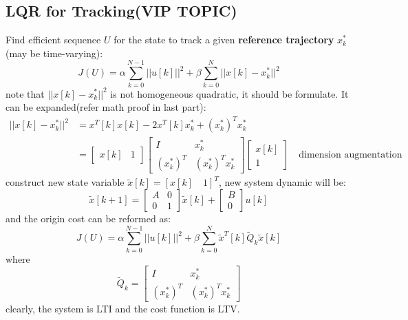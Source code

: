 \documentclass[10pt,a4paper,oneside]{article}
\begin{document}
\subsection{LQR for Tracking(VIP TOPIC)}
Find efficient sequence $U$ for the state to track a given\textbf{ reference trajectory} $x_k^*$(may be time-varying):
\[
J(U) = \alpha \sum_{k=0}^{N-1} ||u[k]||^2 + \beta \sum_{k=0}^{N} ||x[k] - x_k^*||^2
\]
note that $||x[k] - x_k^*||^2$ is not homogeneous quadratic, it should be formulate. It can be expanded(refer math proof in last part):
\begin{align*}
||x[k] - x_k^*||^2 &= x^T[k] x[k] -2x^T[k]x_k^* + (x_k^*)^T x_k^*\\
&=\begin{bmatrix}
x[k] & 1
\end{bmatrix}
\begin{bmatrix}
I & x_k^*\\
(x_k^*)^T &  (x_k^*)^T x_k^*
\end{bmatrix}
\begin{bmatrix}
x[k]\\ 1
\end{bmatrix} \quad \text{dimension augmentation}
\end{align*}
construct new state variable $\tilde{x}[k] = [x[k]\quad 1]^T$, new system dynamic will be:
\[
\tilde{x}[k+1] = \begin{bmatrix}
A & 0 \\ 0& 1
\end{bmatrix} \tilde{x}[k] + \begin{bmatrix}
B \\ 0
\end{bmatrix} u[k]
\]
and the origin cost can be reformed as:
\[
J(U) = \alpha \sum_{k=0}^{N-1} ||u[k]||^2 + \beta \sum_{k=0}^{N} \tilde{x}^T[k] \tilde{Q}_k \tilde{x}[k] 
\]
where
\[
\tilde{Q}_k = \begin{bmatrix}
I & x_k^*\\
(x_k^*)^T &  (x_k^*)^T x_k^*
\end{bmatrix}
\]
clearly, the system is LTI and the cost function is LTV.
\end{document}
